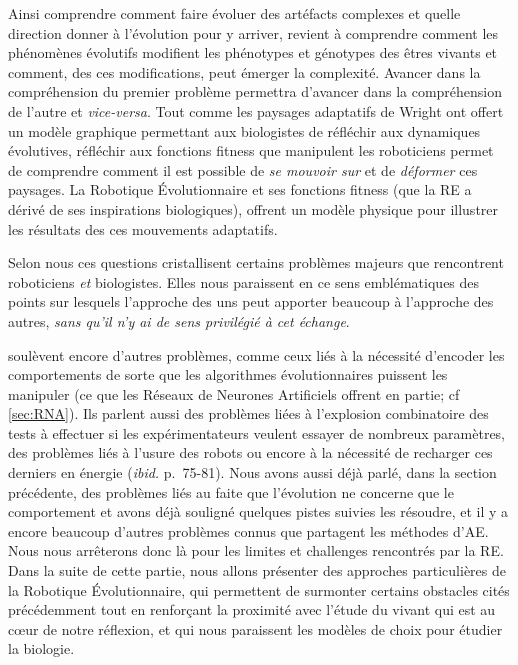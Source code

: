 Ainsi comprendre comment faire évoluer des artéfacts complexes et quelle direction donner à l'évolution pour y arriver, revient à comprendre comment les phénomènes évolutifs modifient les phénotypes et génotypes des êtres vivants et comment, des ces modifications, peut émerger la complexité. Avancer dans la compréhension du premier problème permettra d'avancer dans la compréhension de l'autre et \emph{vice-versa}.
Tout comme les paysages adaptatifs de Wright ont offert un modèle graphique permettant aux biologistes de réfléchir aux dynamiques évolutives, réfléchir aux fonctions fitness que manipulent les roboticiens permet de comprendre comment il est possible de \emph{se mouvoir sur} et de \emph{déformer} ces paysages. La Robotique \'Evolutionnaire et ses fonctions fitness (que la RE a dérivé de ses inspirations biologiques), offrent un modèle physique pour illustrer les résultats des ces mouvements adaptatifs.

Selon nous ces questions cristallisent certains problèmes majeurs que rencontrent roboticiens \emph{et} biologistes. Elles nous paraissent en ce sens emblématiques des points sur lesquels l'approche des uns peut apporter beaucoup à l'approche des autres, \emph{sans qu'il n'y ai de sens privilégié à cet échange}.

\cite{mataric96challengesinevolvingcontrollersforphysicalrobots} soulèvent encore d'autres problèmes, comme ceux liés à la nécessité d'encoder les comportements de sorte que les algorithmes évolutionnaires puissent les manipuler (ce que les Réseaux de Neurones Artificiels offrent en partie; cf \ref{sec:RNA}). Ils parlent aussi des problèmes liées à l'explosion combinatoire des tests à effectuer si les expérimentateurs veulent essayer de nombreux paramètres, des problèmes liés à l'usure des robots ou encore à la nécessité de recharger ces derniers en énergie (\emph{ibid.} p.~75-81).  Nous avons aussi déjà parlé, dans la section précédente, des problèmes liés au faite que l'évolution ne concerne que le comportement et avons déjà souligné quelques pistes suivies les résoudre, et il y a encore beaucoup d'autres problèmes connus que partagent les méthodes d'AE. Nous nous arrêterons donc là pour les limites et challenges rencontrés par la RE.
Dans la suite de cette partie, nous allons présenter des approches particulières de la Robotique \'Evolutionnaire, qui permettent de surmonter certains obstacles cités précédemment tout en renforçant la proximité avec l'étude du vivant qui est au c{\oe}ur de notre réflexion, et qui nous paraissent les modèles de choix pour étudier la biologie.

